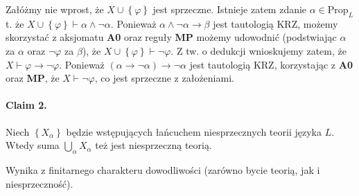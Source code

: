 Załóżmy nie wprost, że \( X \cup \left\{ \varphi \right\} \) jest sprzeczne. Istnieje zatem zdanie \( \alpha \in \mathrm{Prop}_L \) t. że \( X \cup \left\{ \varphi \right\} \vdash \alpha \wedge \neg \alpha \). Ponieważ \( \alpha \wedge \neg \alpha \to \beta \) jest tautologią KRZ, możemy skorzystać z aksjomatu \textbf{A0} oraz reguły \textbf{MP} możemy udowodnić (podstwiając \( \alpha \) za \( \alpha \) oraz \( \neg\varphi \) za \( \beta \)), że \( X \cup \left\{ \varphi \right\} \vdash \neg\varphi\). Z tw. o dedukcji wnioskujemy zatem, że \( X \vdash \varphi \to \neg\varphi \). Ponieważ \( (\alpha \to \neg\alpha) \to \neg\alpha \) jest tautologią KRZ, korzystając z \textbf{A0} oraz \textbf{MP}, że \( X \vdash \neg\varphi \), co jest sprzeczne z założeniami. 

\paragraph{Claim 2.} Niech \( \left\{ X_\alpha \right\} \) będzie wstępujących łańcuchem niesprzecznych teorii języka \( L \). Wtedy suma \( \bigcup_\alpha X_\alpha \) też jest niesprzeczną teorią.

Wynika z finitarnego charakteru dowodliwości (zarówno bycie teorią, jak i niesprzeczność).
